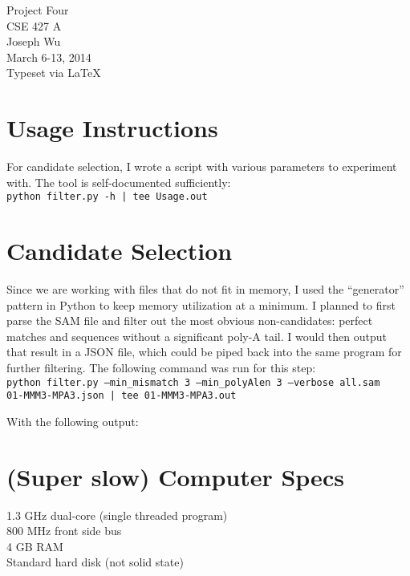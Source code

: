 \documentclass[a4paper, 12pt]{report}
\begin{document}
    \begin{center}
        {\LARGE Project Four} \\
        CSE 427 A \\
        Joseph Wu  \\
        March 6-13, 2014 \\
        {\tiny Typeset via \LaTeX}
    \end{center}
    
\section{Usage Instructions}
    For candidate selection, I wrote a script with various parameters to experiment with.  
    The tool is self-documented sufficiently: \\
    \texttt{python filter.py -h | tee Usage.out}
    
    
\section{Candidate Selection}
    Since we are working with files that do not fit in memory, 
        I used the ``generator'' pattern in Python to keep memory utilization at a minimum.
    I planned to first parse the SAM file and filter out the most obvious non-candidates:
        perfect matches and sequences without a significant poly-A tail.
    I would then output that result in a JSON file, 
        which could be piped back into the same program for further filtering.
    The following command was run for this step: \\
    \texttt{python filter.py --min\_mismatch 3 --min\_polyAlen 3 --verbose all.sam \\
            01-MMM3-MPA3.json | tee 01-MMM3-MPA3.out}
    
    With the following output:
    
    

\section{(Super slow) Computer Specs}
    1.3 GHz dual-core (single threaded program) \\
    800 MHz front side bus \\
    4 GB RAM \\
    Standard hard disk (not solid state)
\end{document}

